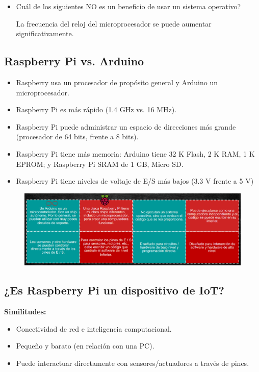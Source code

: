 \documentclass[12pt, twoside, openright]{report} %
\begin{document}
\begin{itemize}
	\item Cuál de los siguientes NO es un beneficio de usar un sistema operativo?

	      La frecuencia del reloj del microprocesador se puede aumentar significativamente.
\end{itemize}

\subsection{Raspberry Pi vs. Arduino}
\begin{itemize}
	\item Raspberry usa un procesador de propósito general y Arduino un microprocesador.
	\item Raspberry Pi es más rápido (1.4 GHz vs. 16 MHz).
	\item Raspberry Pi puede administrar un espacio de direcciones más grande (procesador de 64 bits, frente a 8 bits).
	\item Raspberry Pi tiene más memoria: Arduino tiene 32 K Flash, 2 K RAM, 1 K EPROM; y Raspberry Pi SRAM de 1 GB, Micro SD.
	\item Raspberry Pi tiene niveles de voltaje de E/S más bajos (3.3 V frente a 5 V)
\end{itemize}

\begin{figure}[H]
	{\includegraphics[scale=.62]{2021-03-24 19_03_44-Tema 03 - Gateways IoT - Sistemas Embebidos.png}}
\end{figure}
\pagebreak
\subsection{¿Es Raspberry Pi un dispositivo de IoT?}

\textbf{Similitudes:}
\begin{itemize}
	\item Conectividad de red e inteligencia computacional.
	\item Pequeño y barato (en relación con una PC).
	\item Puede interactuar directamente con sensores/actuadores a través de pines.
\end{itemize}
\end{document}
